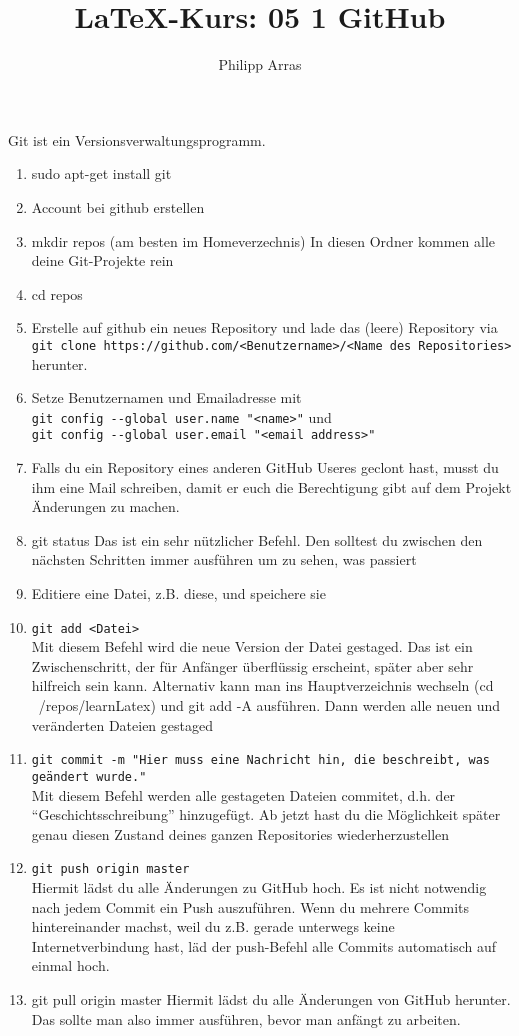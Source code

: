 \documentclass[a4paper,ngerman]{scrartcl} %
\author{Philipp Arras}
\title{\LaTeX -Kurs: 05 1 GitHub}
\begin{document}
\maketitle
Git ist ein Versionsverwaltungsprogramm.

\begin{enumerate}
\item sudo apt-get install git
\item Account bei github erstellen
\item mkdir repos (am besten im Homeverzechnis)
	In diesen Ordner kommen alle deine Git-Projekte rein
\item cd repos
\item Erstelle auf github ein neues Repository und lade das (leere) Repository via \\ \verb|git clone https://github.com/<Benutzername>/<Name des Repositories>| herunter.
\item Setze Benutzernamen und Emailadresse mit\\
\verb|git config --global user.name "<name>"| und \\ \verb|git config --global user.email "<email address>"|
\item Falls du ein Repository eines anderen GitHub Useres geclont hast, musst du ihm eine Mail schreiben, damit er euch die Berechtigung gibt auf dem Projekt Änderungen zu machen.
\item git status
	Das ist ein sehr nützlicher Befehl. Den solltest du zwischen den nächsten Schritten immer ausführen um zu sehen, was passiert
\item Editiere eine Datei, z.B. diese, und speichere sie
\item \verb|git add <Datei>|\\
	Mit diesem Befehl wird die neue Version der Datei gestaged. Das ist ein Zwischenschritt, der für Anfänger überflüssig erscheint, später aber sehr hilfreich sein kann. Alternativ kann man ins Hauptverzeichnis wechseln (cd ~/repos/learnLatex) und git add -A ausführen. Dann werden alle neuen  und veränderten Dateien gestaged
\item \verb|git commit -m "Hier muss eine Nachricht hin, die beschreibt, was geändert wurde."|\\
	Mit diesem Befehl werden alle gestageten Dateien commitet, d.h. der \enquote{Geschichtsschreibung} hinzugefügt. Ab jetzt hast du die Möglichkeit später genau diesen Zustand deines ganzen Repositories wiederherzustellen
\item \verb|git push origin master|\\
	Hiermit lädst du alle Änderungen zu GitHub hoch. Es ist nicht notwendig nach jedem Commit ein Push auszuführen. Wenn du mehrere Commits hintereinander machst, weil du z.B. gerade unterwegs keine Internetverbindung hast, läd der push-Befehl alle Commits automatisch auf einmal hoch.
\item git pull origin master
	Hiermit lädst du alle Änderungen von GitHub herunter. Das sollte man also immer ausführen, bevor man anfängt zu arbeiten.
\end{enumerate}
\end{document}
